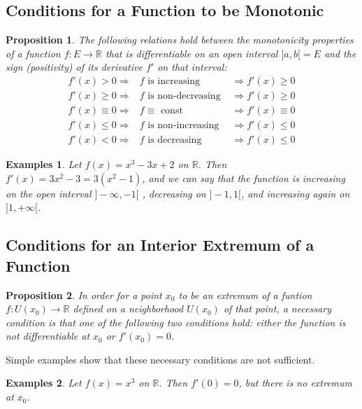 \documentclass[a4paper,12pt]{article} %
\newtheorem{proposition}{Proposition}[section]
\newtheorem{example}{Examples}
\begin{document}
\subsection{Conditions for a Function to be Monotonic}
\begin{proposition}
    \normalfont
    The following relations hold between the monotonicity properties of a 
    function $f: E \to \mathbb{R}$ that is differentiable on an open interval 
    $]a,b[ = E$ and the sign (positivity) of its derivative $f'$ on that interval:
    \[
    \begin{array}{lcl}
        f'(x) > 0 \Rightarrow  & f \text{ is increasing } & \Rightarrow f'(x) \ge 0 \\
        f'(x) \ge 0 \Rightarrow & f \text{ is non-decreasing } & \Rightarrow f'(x) \ge 0 \\
        f'(x) \equiv 0 \Rightarrow & f \equiv \text{ const } & \Rightarrow f'(x) \equiv 0 \\
        f'(x) \le 0 \Rightarrow & f \text{ is non-increasing } & \Rightarrow f'(x) \le 0 \\
        f'(x) < 0 \Rightarrow & f \text{ is decreasing } & \Rightarrow f'(x) \le 0 
    \end{array}
    \]
\end{proposition}
\begin{example}
    \normalfont
    Let $f(x) = x^3 - 3x + 2$ on $\mathbb{R}$. Then $f'(x) = 3x^2 - 3 = 3(x^2 - 1)$, and 
    we can say that the function is increasing on the open interval $]-\infty, -1[$ , 
    decreasing on $]-1,1[$, and increasing again on $]1, +\infty[$.
\end{example}

\subsection{Conditions for an Interior Extremum of a Function}
\begin{proposition}
    \normalfont
    In order for a point $x_0$ to be an extremum of a funtion $f: U(x_0) \to \mathbb{R}$
    defined on a neighborhood $U(x_0)$ of that point, a necessary condition is that 
    one of the following two conditions hold: either the function is not differentiable 
    at $x_0$ or $f'(x_0) = 0$.
\end{proposition}

Simple examples show that these necessary conditions are not sufficient.
\begin{example}
    \normalfont 
    Let $f(x) = x^3$ on $\mathbb{R}$. Then $f'(0) = 0$, but there is no extremum 
    at $x_0$.
\end{example}
\end{document}
